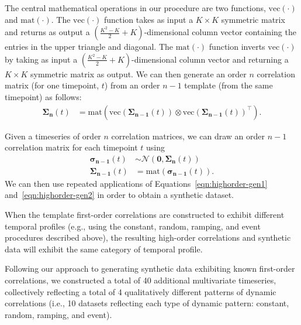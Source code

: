 \documentclass[english]{article}
\begin{document}
The central mathematical operations in our procedure are two
functions, $\mathrm{vec}(\cdot)$ and $\mathrm{mat}(\cdot)$.  The
$\mathrm{vec}(\cdot)$ function takes as input a $K \times K$ symmetric
matrix and returns as output a
$\left(\frac{K^2 - K}{2} + K\right)$-dimensional column vector
containing the entries in the upper triangle and diagonal.  The
$\mathrm{mat}(\cdot)$ function inverts $\mathrm{vec}(\cdot)$ by taking
as input a $\left(\frac{K^2 - K}{2} + K\right)$-dimensional column
vector and returning a $K \times K$ symmetric matrix as output.  We
can then generate an order $n$ correlation matrix (for one timepoint, $t$) from an order
$n - 1$ template (from the same timepoint) as follows:
\begin{align}
  \mathbf{\Sigma_{n}}(t) &= \mathrm{mat}(\mathrm{vec}(\mathbf{\Sigma_{n-1}}(t)) \otimes \mathrm{vec}(\mathbf{\Sigma_{n-1}}(t))^\top).\label{eqn:veccorr}
\end{align}

Given a timeseries of order $n$ correlation matrices, we can draw an
order $n-1$ correlation matrix for each timepoint $t$ using
\begin{align}
 \mathbf{\sigma_{n-1}}(t) &\sim \mathcal{N}\left(\mathbf{0}, \mathbf{\Sigma_n}(t)
                   \right)\label{eqn:highorder-gen1}\\
  \mathbf{\Sigma_{n-1}}(t) &= \mathrm{mat}(\mathbf{\sigma_{n-1}}(t)).\label{eqn:highorder-gen2}
  \end{align}
  We can then use repeated applications of
  Equations~\ref{eqn:highorder-gen1} and~\ref{eqn:highorder-gen2} in
  order to obtain a synthetic dataset.

 When the template first-order correlations are constructed to exhibit different
 temporal profiles (e.g., using the constant, random, ramping, and
 event procedures described above), the resulting high-order
 correlations and synthetic data will exhibit the same category of
 temporal profile.

 Following our approach to generating synthetic data exhibiting known
 first-order correlations, we constructed a total of 40 additional multivariate timeseries,
collectively reflecting a total of 4 qualitatively different patterns
of dynamic correlations (i.e., 10 datasets reflecting each type of
dynamic pattern: constant, random, ramping, and event).

 
\end{document}

